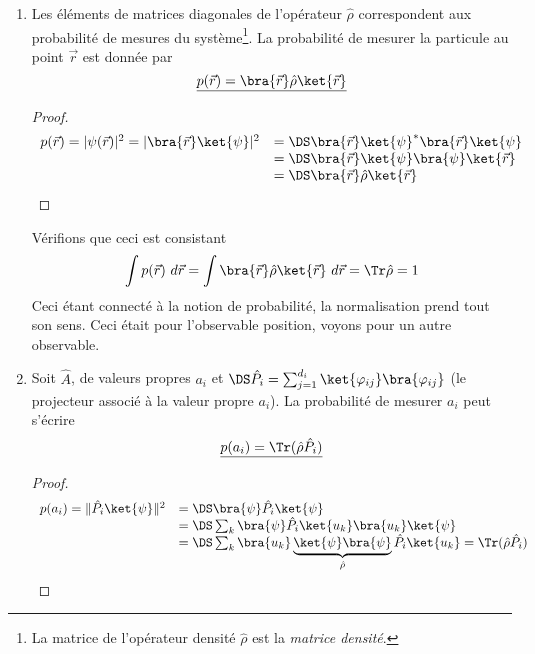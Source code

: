 \begin{enumerate}
\item Les éléments de matrices diagonales  de l'opérateur $\hat{\rho}$ correspondent aux probabilité de mesures du système\footnote{La matrice de l'opérateur densité $\hat{\rho}$ est la \textit{matrice densité}.}. La probabilité 
de mesurer la particule au point $\vec{r}$ est donnée par
\begin{equation}
\underline{p(\vec{r}) = \bra{\vec{r}}\hat{\rho}\ket{\vec{r}}}
\end{equation}
\begin{proof}
\begin{equation}
\begin{array}{ll}
p(\vec{r}) = |\psi(\vec{r})|^2 = |\bra{\vec{r}}\ket{\psi}|^2 &=\DS \bra{\vec{r}}\ket{\psi}^*\bra{\vec{r}}\ket{\psi}\\
&=\DS \bra{\vec{r}}\ket{\psi}\bra{\psi}\ket{\vec{r}}\\
&=\DS \bra{\vec{r}}\hat{\rho}\ket{\vec{r}}
\end{array}
\end{equation}
\end{proof}
Vérifions que ceci est consistant
\begin{equation}
\int p(\vec{r})\ d\vec{r} = \int \bra{\vec{r}}\hat{\rho}\ket{\vec{r}}\ d\vec{r} = \Tr\hat{\rho} = 1
\end{equation}
Ceci étant connecté à la notion de probabilité, la normalisation prend tout son sens. 
Ceci était pour l'observable position, voyons pour un autre observable. 
\item Soit $\hat{A}$, de valeurs propres $a_i$ et $\DS \hat{P_i} = \sum_{j=1}^{d_i} \ket{\varphi_{ij}}\bra{\varphi_{ij}}$ (le projecteur associé à la valeur propre $a_i$). La probabilité de mesurer $a_i$ peut s'écrire
\begin{equation}
\underline{p(a_i) = \Tr(\hat{\rho}\hat{P_i})}
\end{equation}
\begin{proof}
\begin{equation}
\begin{array}{ll}
p(a_i) = \|\hat{P_i}\ket{\psi}\|^2 &=\DS \bra{\psi}\hat{P_i}\ket{\psi}\\
&=\DS \sum_k \bra{\psi}\hat{P_i}\ket{u_k}\bra{u_k}\ket{\psi}\\
&=\DS \sum_k \bra{u_k}\underbrace{\ket{\psi}\bra{\psi}}_{\hat{\rho}}\hat{P_i}\ket{u_k} = \Tr(\hat{\rho}\hat{P_i})
\end{array}
\end{equation}

\end{proof}
\end{enumerate}
